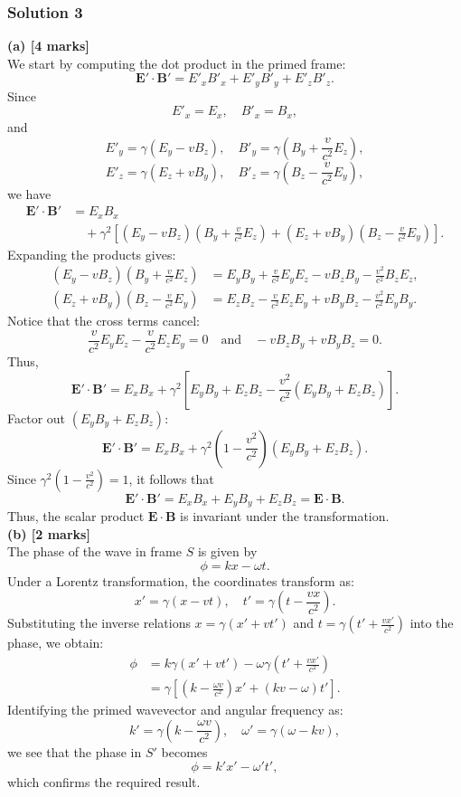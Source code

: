 \documentclass{article}
\begin{document}
\subsubsection{Solution 3}
\textbf{(a) [4 marks]}\\
We start by computing the dot product in the primed frame:
\[
\mathbf{E}'\cdot\mathbf{B}' = E'_xB'_x + E'_yB'_y + E'_zB'_z.
\]
Since
\[
E'_x = E_x,\quad B'_x = B_x,
\]
and
\[
E'_y = \gamma (E_y - vB_z),\quad B'_y = \gamma \left( B_y + \frac{v}{c^2}E_z \right),
\]
\[
E'_z = \gamma (E_z + vB_y),\quad B'_z = \gamma \left( B_z - \frac{v}{c^2}E_y \right),
\]
we have
\[
\begin{aligned}
\mathbf{E}'\cdot\mathbf{B}' &= E_xB_x \\
&\quad + \gamma^2\left[(E_y-vB_z)\left(B_y+\frac{v}{c^2}E_z\right) + (E_z+vB_y)\left(B_z-\frac{v}{c^2}E_y\right)\right].
\end{aligned}
\]
Expanding the products gives:
\[
\begin{aligned}
(E_y - vB_z)\left(B_y+\frac{v}{c^2}E_z\right) &= E_yB_y + \frac{v}{c^2}E_yE_z - vB_zB_y - \frac{v^2}{c^2}B_zE_z, \\
(E_z + vB_y)\left(B_z-\frac{v}{c^2}E_y\right) &= E_zB_z - \frac{v}{c^2}E_zE_y + vB_yB_z - \frac{v^2}{c^2}E_yB_y.
\end{aligned}
\]
Notice that the cross terms cancel:
\[
\frac{v}{c^2}E_yE_z - \frac{v}{c^2}E_zE_y = 0 \quad \text{and} \quad -vB_zB_y + vB_yB_z = 0.
\]
Thus,
\[
\mathbf{E}'\cdot\mathbf{B}' = E_xB_x + \gamma^2\left[E_yB_y + E_zB_z - \frac{v^2}{c^2}(E_yB_y + E_zB_z)\right].
\]
Factor out \((E_yB_y+E_zB_z)\):
\[
\mathbf{E}'\cdot\mathbf{B}' = E_xB_x + \gamma^2\left(1-\frac{v^2}{c^2}\right)(E_yB_y+E_zB_z).
\]
Since \(\gamma^2(1-\frac{v^2}{c^2})=1\), it follows that
\[
\mathbf{E}'\cdot\mathbf{B}' = E_xB_x+E_yB_y+E_zB_z = \mathbf{E}\cdot\mathbf{B}.
\]
Thus, the scalar product \(\mathbf{E}\cdot\mathbf{B}\) is invariant under the transformation.\\

\textbf{(b) [2 marks]}\\
The phase of the wave in frame \(S\) is given by
\[
\phi = kx-\omega t.
\]
Under a Lorentz transformation, the coordinates transform as:
\[
x'=\gamma (x-vt), \quad t'=\gamma \left(t-\frac{vx}{c^2}\right).
\]
Substituting the inverse relations \(x = \gamma (x'+vt')\) and \(t = \gamma \left(t'+\frac{vx'}{c^2}\right)\) into the phase, we obtain:
\[
\begin{aligned}
\phi &= k\gamma (x'+vt') - \omega\gamma \left(t'+\frac{vx'}{c^2}\right) \\
&=\gamma\left[\left(k-\frac{\omega v}{c^2}\right)x' + (kv-\omega)t'\right].
\end{aligned}
\]
Identifying the primed wavevector and angular frequency as:
\[
k'=\gamma\left(k-\frac{\omega v}{c^2}\right), \quad \omega'=\gamma (\omega-kv),
\]
we see that the phase in \(S'\) becomes
\[
\phi = k'x' - \omega' t',
\]
which confirms the required result.\\
\end{document}
